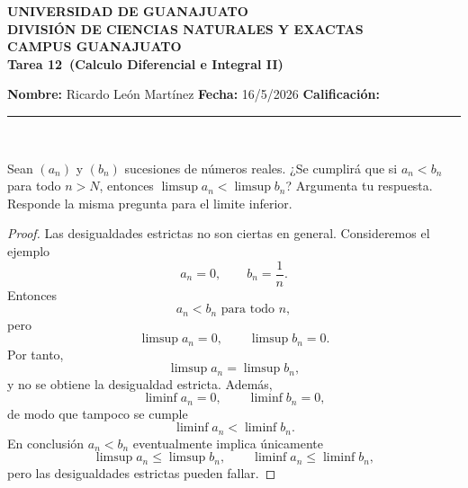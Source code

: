 \documentclass[12pt,a4paper]{article}
\newcommand{\alumno}{Ricardo León Martínez}
\newcommand{\materia}{Calculo Diferencial e Integral II}
\newcommand{\tarea}{Tarea 12}
\newcommand{\fecha}{16/5/2026}
\begin{document}
    \begin{center}
    {\large\textbf{UNIVERSIDAD DE GUANAJUATO}}\\[0.3cm]
    {\normalsize\textbf{DIVISIÓN DE CIENCIAS NATURALES Y EXACTAS}}\\
    {\normalsize\textbf{CAMPUS GUANAJUATO}}\\[1cm]

    {\Large\textbf{\tarea\ (\materia)}}\\[1cm]
    \end{center}

    \textbf{Nombre:} \alumno \hfill 
    \textbf{Fecha:} \fecha \hfill 
    \textbf{Calificación:} \rule{3cm}{0.4pt} \\[0.3cm]

    \begin{mdframed}[style=mdpinkbox,frametitle={Ejercicio 1}]
        Sean $(a_{n})$ y $(b_{n})$ sucesiones de números reales. ¿Se cumplirá que si $a_{n}\lt b_{n}$ para todo $n\gt N$,
        entonces $\limsup a_{n}\lt\limsup b_{n}$? Argumenta tu respuesta. Responde la misma
        pregunta para el limite inferior.
    \end{mdframed}

    \begin{proof}
        Las desigualdades estrictas no son ciertas en general. Consideremos el ejemplo
        \begin{equation*}
            a_{n}=0,\qquad b_{n}=\frac{1}{n}.
        \end{equation*}
        Entonces
        \begin{equation*}
            a_{n}\lt b_{n}\text{ para todo }n,
        \end{equation*}
        pero
        \begin{equation*}
            \limsup a_{n}=0,\qquad\limsup b_{n}=0.
        \end{equation*}
        Por tanto,
        \begin{equation*}
            \limsup a_{n}=\limsup b_{n},
        \end{equation*}
        y no se obtiene la desigualdad estricta. Además,
        \begin{equation*}
            \liminf a_{n}=0,\qquad \liminf b_{n}=0,
        \end{equation*}
        de modo que tampoco se cumple
        \begin{equation*}
            \liminf a_{n}\lt\liminf b_{n}.
        \end{equation*}
        En conclusión $a_{n}\lt b_{n}$ eventualmente implica únicamente
        \begin{equation*}
            \limsup a_{n}\leq\limsup b_{n},\qquad\liminf a_{n}\leq \liminf b_{n},
        \end{equation*}
        pero las desigualdades estrictas pueden fallar.
    \end{proof}
\end{document}
